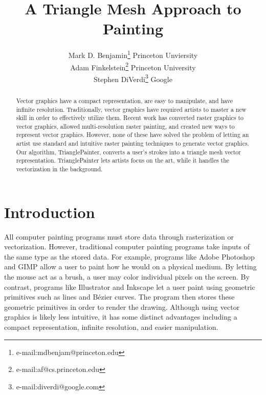 \documentclass[review]{acmsiggraph}
\title{A Triangle Mesh Approach to Painting}
\author{Mark D. Benjamin\thanks{e-mail:mdbenjam@princeton.edu} \hspace{10 pt} Princeton Unviersity\\ Adam Finkelstein\thanks{e-mail:af@cs.princeton.edu} \hspace{10 pt} Princeton University\\ Stephen DiVerdi\thanks{e-mail:diverdi@google.com} \hspace{10 pt} Google}
\begin{document}

\maketitle

\begin{abstract}
Vector graphics have a compact representation, are easy to manipulate, and have infinite resolution.
Traditionally, vector graphics have required artists to master a new skill in order to effectively utilize
them. Recent work has converted raster graphics to vector graphics, allowed multi-resolution raster painting,
and created new ways to represent vector graphics. However, none of these have solved the problem of
letting an artist use standard and intuitive raster painting techniques to generate vector graphics.
Our algorithm, TrianglePainter, converts a user's strokes into a triangle mesh vector representation. 
TrianglePainter lets artists focus on the art, while it handles the vectorization in the background.

\end{abstract}

\begin{CRcatlist}
\end{CRcatlist}

\keywordlist


\TOGlinkslist


\copyrightspace

\section{Introduction}

All computer painting programs must store data through rasterization or vectorization. 
However, traditional computer painting programs take inputs of the same type as the stored data. 
For example, programs like Adobe Photoshop and GIMP
allow a user to paint how he would on a physical medium. By letting the mouse act as
a brush, a user may color individual pixels on the screen. By contrast, programs like 
Illustrator and Inkscape let a user paint
using geometric primitives such as lines and B\'{e}zier curves. The program then stores
these geometric primitives in order to render the drawing. Although using vector graphics
is likely less intuitive, it has some distinct advantages including a compact
representation, infinite resolution, and easier manipulation.
\end{document}
